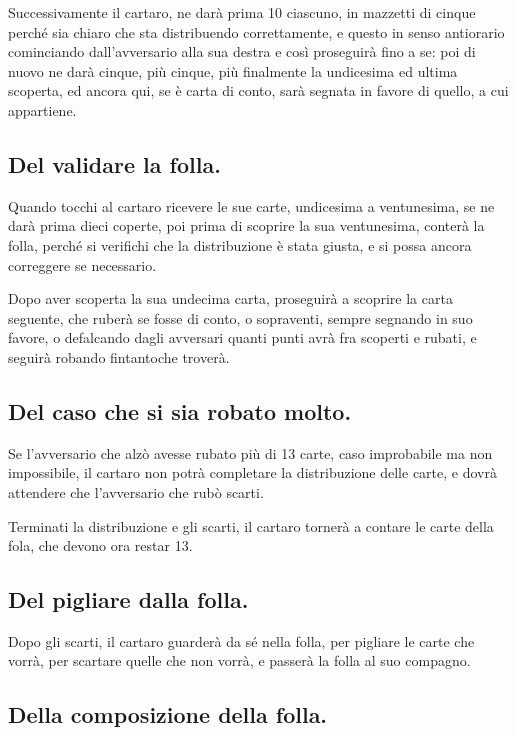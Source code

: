 \documentclass[11pt,a6paper]{article}
\begin{document}
Successivamente il cartaro, ne darà prima 10 ciascuno, in mazzetti di cinque
perché sia chiaro che sta distribuendo correttamente, e questo in senso
antiorario cominciando dall'avversario alla sua destra e così proseguirà
fino a se: poi di nuovo ne darà cinque, più cinque, più finalmente la
undicesima ed ultima scoperta, ed ancora qui, se è carta di conto, sarà
segnata in favore di quello, a cui appartiene.

\subsection{Del validare la folla.}

Quando tocchi al cartaro ricevere le sue carte, undicesima a ventunesima, se
ne darà prima dieci coperte, poi prima di scoprire la sua ventunesima,
conterà la folla, perché si verifichi che la distribuzione è stata giusta, e
si possa ancora correggere se necessario.

Dopo aver scoperta la sua undecima carta, proseguirà a scoprire la carta
seguente, che ruberà se fosse di conto, o sopraventi, sempre segnando in suo
favore, o defalcando dagli avversari quanti punti avrà fra scoperti e
rubati, e seguirà robando fintantoche troverà.

\subsection{Del caso che si sia robato molto.}

Se l'avversario che alzò avesse rubato più di 13 carte, caso improbabile ma
non impossibile, il cartaro non potrà completare la distribuzione delle
carte, e dovrà attendere che l'avversario che rubò scarti.

Terminati la distribuzione e gli scarti, il cartaro tornerà a contare le
carte della fola, che devono ora restar 13.

\subsection{Del pigliare dalla folla.}

Dopo gli scarti, il cartaro guarderà da sé nella folla, per pigliare le
carte che vorrà, per scartare quelle che non vorrà, e passerà la folla al
suo compagno.

\subsection{Della composizione della folla.}
\end{document}
